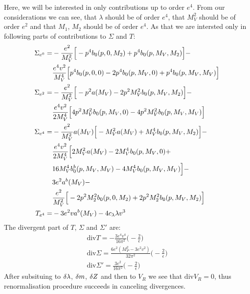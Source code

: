 Here, we will be interested in only contributions up to order $e^4$. From our \MSbar considerations 
we can see, that $\lambda$ should be of order $e^4$, that $M_V^2$ should be of order $e^2$ and 
that $M_1$, $M_2$ should be of order $e^4$. 
As that we are 
intersted only in following parts of contributions to $\Sigma$ and $T$:
\begin{align}
\Sigma_{e^0} = &-\frac{e^2}{M_V^2}\Big[-p^4b_0(p,0,M_2)+p^4b_0(p,M_V,M_2)\Big]-\notag \\
&\frac{e^4v^2}{M_V^4}\Big[p^4b_0(p,0,0)-2p^4b_0(p,M_V,0)+p^4b_0(p,M_V,M_V)\Big] \\
\Sigma_{e^2} = &-\frac{e^2}{M_V^2}\Big[-p^2a(M_V)-2p^2M_V^2b_0(p,M_V,M_2)\Big]-\notag \\
&\frac{e^4v^2}{2M_V^4}\Big[4p^2M_V^2b_0(p,M_V,0)-4p^2M_V^2b_0(p,M_V,M_V)\Big] \\
\Sigma_{e^4} = &-\frac{e^2}{M_V^2}a(M_V)\Big[-M_V^2a(M_V)+M_V^4b_0(p,M_V,M_2)\Big]-\notag \\
&\frac{e^4v^2}{2M_V^4}\Big[2M_V^2a(M_V)-2M_V^4b_0(p,M_V,0)+\notag \\
&16M_V^4b_0^b(p,M_V,M_V)-4M_V^4b_0(p,M_V,M_V)\Big]-\notag\\
&3e^2a^b(M_V)-\notag\\
&\frac{e^2}{M_V^2}\Big[-2p^2M_2^2b_0(p,0,M_2)+2p^2M_2^2b_0(p,M_V,M_2)\Big] \\
T_{e^4} = & -3e^2va^b(M_V)-4c_\lambda\lambda v^3
\end{align}
The divergent part of $T$, $\Sigma$ and $\Sigma'$ are:
\begin{align}
\textrm{div}T = -\frac{3e^4v^4}{16\pi^2}\Big(-\frac{2}{\epsilon}\Big)\\
\textrm{div}\Sigma = \frac{6e^2(M_P^2-3e^2v^2)}{32\pi^2}\Big(-\frac{2}{\epsilon}\Big)\\
\textrm{div}\Sigma' = \frac{3e^2}{16\pi^2}\Big(-\frac{2}{\epsilon}\Big)
\end{align}
After subsituing to $\delta\lambda$, $\delta m$, $\delta Z$ and then to $V_R$ we see that $\textrm{div}V_R = 0$, 
thus renormalisation procedure succeeds in canceling divergences.
